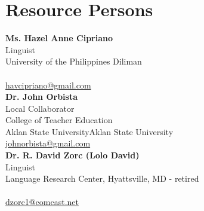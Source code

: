 %
%
%                 

\chapter{Resource Persons}
\label{sec:appendixb}

%
%
%
%

\newcommand{\resperson}[5]{%
    \textbf{#1} \\ %
    #2 \\          %
    #3 \\          %
    \ifx\empty#4\empty\else #4 \\ \fi %
    \url{#5}\vspace{0.5em}\\  %
}

\resperson{Ms. Hazel Anne Cipriano}{Linguist}{University of the Philippines Diliman}{}{havcipriano@gmail.com}
\resperson{Dr. John Orbista}{Local Collaborator}{College of Teacher Education}{Aklan State University}{johnorbista@gmail.com}
\resperson{Dr. R. David Zorc (Lolo David)}{Linguist}{Language Research Center, Hyattsville, MD - retired}{}{dzorc1@comcast.net}
